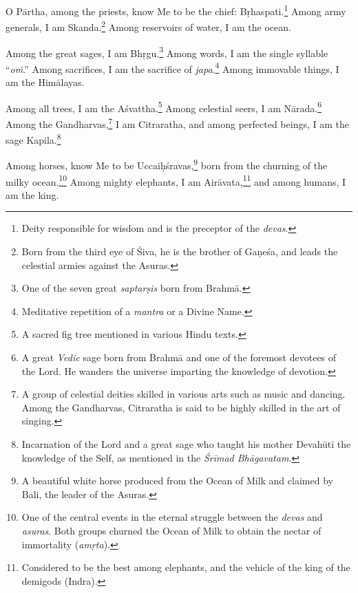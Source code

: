 {O Pārtha, among the priests, know Me to be the chief: Bṛhaspati.\footnote{Deity responsible for wisdom and is the preceptor of the \textit{devas}.} Among army generals, I am Skanda.\footnote{Born from the third eye of Śiva, he is the brother of Gaṇeśa, and leads the celestial armies against the Asuras.} Among reservoirs of water, I am the ocean.}

{Among the great sages, I am Bhṛgu.\footnote{One of the seven great \textit{saptarṣis} born from Brahmā.} Among words, I am the single syllable \enquote{\textit{oṁ}.} Among sacrifices, I am the sacrifice of \textit{japa}.\footnote{Meditative repetition of a \textit{mantra} or a Divine Name.} Among immovable things, I am the Himālayas.}

{Among all trees, I am the Aśvattha.\footnote{A sacred fig tree mentioned in various Hindu texts.} Among celestial seers, I am Nārada.\footnote{A great \textit{Vedic} sage born from Brahmā and one of the foremost devotees of the Lord. He wanders the universe imparting the knowledge of devotion.} Among the Gandharvas,\footnote{A group of celestial deities skilled in various arts such as music and dancing. Among the Gandharvas, Citraratha is said to be highly skilled in the art of singing.} I am Citraratha, and among perfected beings, I am the sage Kapila.\footnote{Incarnation of the Lord and a great sage who taught his mother Devahūtī the knowledge of the Self, as mentioned in the \textit{Śrīmad Bhāgavatam}.}}

{Among horses, know Me to be Uccaiḥśravas,\footnote{A beautiful white horse produced from the Ocean of Milk and claimed by Bali, the leader of the Asuras.} born from the churning of the milky ocean.\footnote{One of the central events in the eternal struggle between the \textit{devas} and \textit{asuras}. Both groups churned the Ocean of Milk to obtain the nectar of immortality (\textit{amṛta}).} Among mighty elephants, I am Airāvata,\footnote{Considered to be the best among elephants, and the vehicle of the king of the demigods (Indra).} and among humans, I am the king.}


